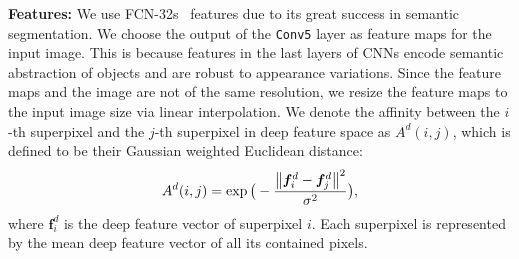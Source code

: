\documentclass[journal]{IEEEtran}
\begin{document}
\noindent \textbf{Features:}
We use FCN-32s~\cite{Long2015Fully} features due to its great success in semantic segmentation. We choose the output of the \texttt{Conv5} layer as feature maps for the input image. This is because features in the last layers of CNNs encode semantic abstraction of objects and are robust to appearance variations. Since the feature maps and the image are not of the same resolution, we resize the feature maps to the input image size via linear interpolation. We denote the affinity between the $i$-th superpixel and the $j$-th superpixel in deep feature space as $A^d(i,j)$, which is defined to be their Gaussian weighted Euclidean distance:
\begin{equation}
\setlength{\abovedisplayskip}{2pt}
\setlength{\belowdisplayskip}{2pt}
A^d(i, j) = \exp \big( -\frac{\left\| \boldsymbol{f}_i^d - \boldsymbol{f}_j^d \right\|^2}{\sigma^2} \big), 
\end{equation}
where $\boldsymbol{f}^d_i$ is the deep feature vector of superpixel $i$. Each superpixel is represented by the mean deep feature vector of all its contained pixels.
\end{document}
